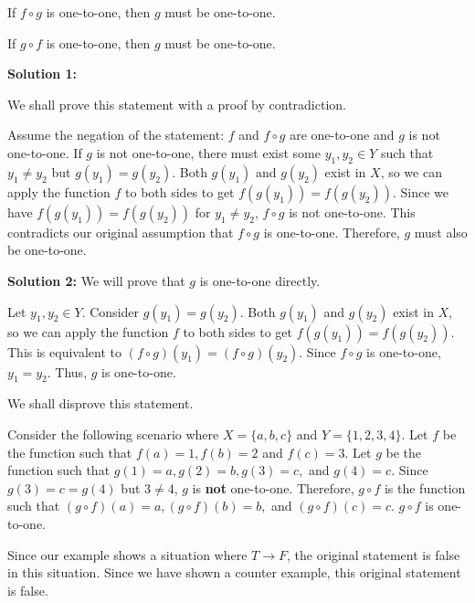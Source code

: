 \documentclass[12pt]{exam}
\begin{document}
\begin{qparts}
    \item If  $ f \circ g $ is one-to-one, then $ g $ must be one-to-one.
    \item If $ g \circ f $ is one-to-one, then $ g $ must be one-to-one.
\end{qparts}

\begin{solution}
\begin{qparts}
    \item
    \textbf
    {Solution 1:}

    We shall prove this statement with a proof by contradiction.

    Assume the negation of the statement: $f$ and $f\circ g$ are one-to-one and $g$ is not one-to-one. If $g$ is not one-to-one, there must exist some $y_{1}, y_{2} \in Y$ such that $y_{1}\neq y_{2}$ but $g(y_{1})=g(y_{2})$. Both $g(y_{1})$ and $g(y_{2})$ exist in $X$, so we can apply the function $f$ to both sides to get $f(g(y_1))=f(g(y_2))$. Since we have $f(g(y_1))=f(g(y_2))$ for $y_1 \neq y_2$, $f \circ g$ is not one-to-one. This contradicts our original assumption that $f\circ g$ is one-to-one. Therefore, $g$ must also be one-to-one.
    
    \textbf{Solution 2:}
    We will prove that $g$ is one-to-one directly.
    
    Let $y_1, y_2 \in Y$. Consider $g(y_1) = g(y_2)$. Both $g(y_{1})$ and $g(y_{2})$ exist in $X$, so we can apply the function $f$ to both sides to get $f(g(y_1)) = f(g(y_2))$. This is equivalent to $(f \circ g)(y_1) = (f \circ g)(y_2)$. Since $f \circ g$ is one-to-one, $y_1 = y_2$. Thus, $g$ is one-to-one.

    \item
    We shall disprove this statement.

    Consider the following scenario where $X = \{a, b, c\}$ and $Y = \{1, 2, 3, 4\}$. Let $f$ be the function such that $f(a) = 1, f(b) = 2$ and $f(c) = 3$. Let $g$ be the function such that $g(1) = a, g(2) = b, g(3) = c,$ and $g(4) = c$. Since $g(3) = c = g(4)$ but $3 \neq 4$, $g$ is \textbf{not} one-to-one. Therefore, $g \circ f$ is the function such that $(g \circ f)(a) = a, (g \circ f)(b) = b,$ and $(g \circ f)(c) = c$. $g \circ f$ is one-to-one.
    
    Since our example shows a situation where $T \to F$, the original statement is false in this situation. Since we have shown a counter example, this original statement is false.
\end{qparts}


\end{solution}
\end{document}
